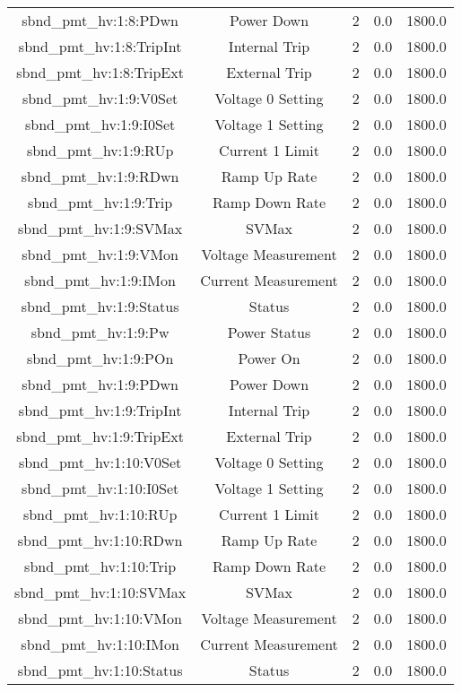 \begin{table}[ptb]
\begin{tabular}{c | c c c c}
sbnd_pmt_hv:1:8:PDwn & Power Down & 2 & 0.0 & 1800.0\\ 
sbnd_pmt_hv:1:8:TripInt & Internal Trip & 2 & 0.0 & 1800.0\\ 
sbnd_pmt_hv:1:8:TripExt & External Trip & 2 & 0.0 & 1800.0\\ 
sbnd_pmt_hv:1:9:V0Set & Voltage 0 Setting & 2 & 0.0 & 1800.0\\ 
sbnd_pmt_hv:1:9:I0Set & Voltage 1 Setting & 2 & 0.0 & 1800.0\\ 
sbnd_pmt_hv:1:9:RUp & Current 1 Limit & 2 & 0.0 & 1800.0\\ 
sbnd_pmt_hv:1:9:RDwn & Ramp Up Rate & 2 & 0.0 & 1800.0\\ 
sbnd_pmt_hv:1:9:Trip & Ramp Down Rate & 2 & 0.0 & 1800.0\\ 
sbnd_pmt_hv:1:9:SVMax & SVMax & 2 & 0.0 & 1800.0\\ 
sbnd_pmt_hv:1:9:VMon & Voltage Measurement & 2 & 0.0 & 1800.0\\ 
sbnd_pmt_hv:1:9:IMon & Current Measurement & 2 & 0.0 & 1800.0\\ 
sbnd_pmt_hv:1:9:Status & Status & 2 & 0.0 & 1800.0\\ 
sbnd_pmt_hv:1:9:Pw & Power Status & 2 & 0.0 & 1800.0\\ 
sbnd_pmt_hv:1:9:POn & Power On & 2 & 0.0 & 1800.0\\ 
sbnd_pmt_hv:1:9:PDwn & Power Down & 2 & 0.0 & 1800.0\\ 
sbnd_pmt_hv:1:9:TripInt & Internal Trip & 2 & 0.0 & 1800.0\\ 
sbnd_pmt_hv:1:9:TripExt & External Trip & 2 & 0.0 & 1800.0\\ 
sbnd_pmt_hv:1:10:V0Set & Voltage 0 Setting & 2 & 0.0 & 1800.0\\ 
sbnd_pmt_hv:1:10:I0Set & Voltage 1 Setting & 2 & 0.0 & 1800.0\\ 
sbnd_pmt_hv:1:10:RUp & Current 1 Limit & 2 & 0.0 & 1800.0\\ 
sbnd_pmt_hv:1:10:RDwn & Ramp Up Rate & 2 & 0.0 & 1800.0\\ 
sbnd_pmt_hv:1:10:Trip & Ramp Down Rate & 2 & 0.0 & 1800.0\\ 
sbnd_pmt_hv:1:10:SVMax & SVMax & 2 & 0.0 & 1800.0\\ 
sbnd_pmt_hv:1:10:VMon & Voltage Measurement & 2 & 0.0 & 1800.0\\ 
sbnd_pmt_hv:1:10:IMon & Current Measurement & 2 & 0.0 & 1800.0\\ 
sbnd_pmt_hv:1:10:Status & Status & 2 & 0.0 & 1800.0\\ 

\end{tabular}
\end{table}
